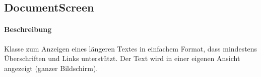 \subsection{DocumentScreen}
\paragraph*{Beschreibung}
Klasse zum Anzeigen eines längeren Textes in einfachem Format, 
dass mindestens Überschriften und Links unterstützt.
Der Text wird in einer eigenen Ansicht angezeigt (ganzer Bildschirm).